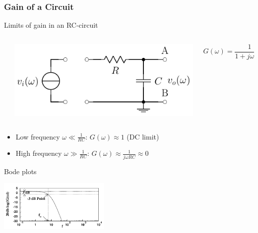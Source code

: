 \documentclass[beamer]{standalone}
\begin{document}
\begin{frame}
 \frametitle{Gain of a Circuit}
 \begin{block}{Limits of gain in an RC-circuit}
  \begin{columns}
   \begin{column}{0.0\textwidth}
   \end{column}
   \begin{column}{0.5\textwidth}
    \includegraphics[width=\textwidth]{pics/RC_filter}
   \end{column}
   \begin{column}{0.5\textwidth}
    \begin{equation*}
     G(\omega) = \frac{1}{1 + j\omega R C}
    \end{equation*}
   \end{column}
  \end{columns}
  \begin{itemize}
   \item Low frequency $\omega \ll \frac{1}{RC}$: $G(\omega) \approx 1$ (DC limit)
   \item High frequency $\omega \gg \frac{1}{RC}$: $G(\omega) \approx \frac{1}{j\omega R C} \approx 0$
  \end{itemize}
 \end{block}
 \begin{block}{Bode plots}
  \begin{center}
   \includegraphics[width=0.4\textwidth]{pics/Bode_plot}
  \end{center}
 \end{block}
\end{frame}
\end{document}
